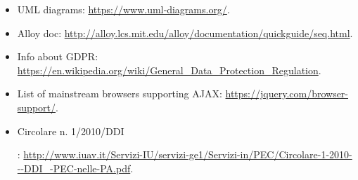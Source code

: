 \begin{itemize}
	\item UML diagrams: \url{https://www.uml‐diagrams.org/}.
    \item Alloy doc: \url{http://alloy.lcs.mit.edu/alloy/documentation/quickguide/seq.html}.
    \item Info about GDPR: \url{https://en.wikipedia.org/wiki/General_Data_Protection_Regulation}.
    \item List of mainstream browsers supporting AJAX: \url{https://jquery.com/browser-support/}.
    \item \hypertarget{CircolarePEC}{Circolare n. 1/2010/DDI}: \url{http://www.iuav.it/Servizi-IU/servizi-ge1/Servizi-in/PEC/Circolare-1-2010---DDI_-PEC-nelle-PA.pdf}.
\end{itemize}